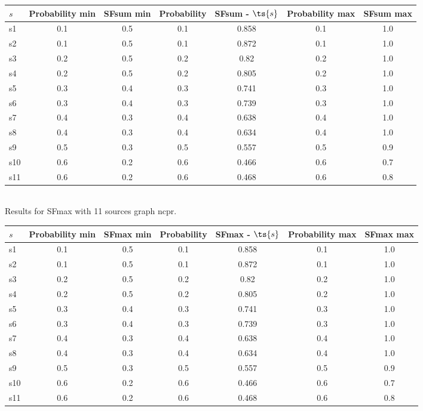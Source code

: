 \documentclass{article}
\begin{document}
\noindent\begin{tabular}{|l|c|c|c|c|c|c|}
\hline
$s$& Probability min & SFsum min & Probability & SFsum - $\ts{s}$ & Probability max & SFsum max\\
\hline
s1 &0.1 & 0.5 & 0.1 & 0.858 & 0.1 & 1.0\\
\hline
s2 &0.1 & 0.5 & 0.1 & 0.872 & 0.1 & 1.0\\
\hline
s3 &0.2 & 0.5 & 0.2 & 0.82 & 0.2 & 1.0\\
\hline
s4 &0.2 & 0.5 & 0.2 & 0.805 & 0.2 & 1.0\\
\hline
s5 &0.3 & 0.4 & 0.3 & 0.741 & 0.3 & 1.0\\
\hline
s6 &0.3 & 0.4 & 0.3 & 0.739 & 0.3 & 1.0\\
\hline
s7 &0.4 & 0.3 & 0.4 & 0.638 & 0.4 & 1.0\\
\hline
s8 &0.4 & 0.3 & 0.4 & 0.634 & 0.4 & 1.0\\
\hline
s9 &0.5 & 0.3 & 0.5 & 0.557 & 0.5 & 0.9\\
\hline
s10 &0.6 & 0.2 & 0.6 & 0.466 & 0.6 & 0.7\\
\hline
s11 &0.6 & 0.2 & 0.6 & 0.468 & 0.6 & 0.8\\
\hline
\end{tabular}\\

\noindent Results for SFmax with 11 sources graph ncpr.

\noindent\begin{tabular}{|l|c|c|c|c|c|c|}
\hline
$s$& Probability min & SFmax min & Probability & SFmax - $\ts{s}$ & Probability max & SFmax max\\
\hline
s1 &0.1 & 0.5 & 0.1 & 0.858 & 0.1 & 1.0\\
\hline
s2 &0.1 & 0.5 & 0.1 & 0.872 & 0.1 & 1.0\\
\hline
s3 &0.2 & 0.5 & 0.2 & 0.82 & 0.2 & 1.0\\
\hline
s4 &0.2 & 0.5 & 0.2 & 0.805 & 0.2 & 1.0\\
\hline
s5 &0.3 & 0.4 & 0.3 & 0.741 & 0.3 & 1.0\\
\hline
s6 &0.3 & 0.4 & 0.3 & 0.739 & 0.3 & 1.0\\
\hline
s7 &0.4 & 0.3 & 0.4 & 0.638 & 0.4 & 1.0\\
\hline
s8 &0.4 & 0.3 & 0.4 & 0.634 & 0.4 & 1.0\\
\hline
s9 &0.5 & 0.3 & 0.5 & 0.557 & 0.5 & 0.9\\
\hline
s10 &0.6 & 0.2 & 0.6 & 0.466 & 0.6 & 0.7\\
\hline
s11 &0.6 & 0.2 & 0.6 & 0.468 & 0.6 & 0.8\\
\hline
\end{tabular}\\
\end{document}
